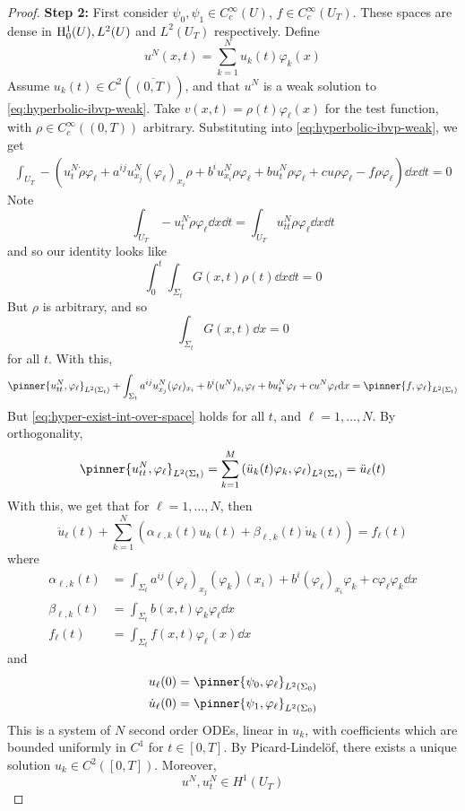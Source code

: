 \documentclass{article}
\begin{document}
\begin{proof}
    \textbf{Step 2:} First consider \(\psi_0, \psi_1 \in C_c^\infty(U)\), \(f \in C_c^\infty(U_T)\). These spaces are dense in \(\mathrm{H}^1_0(U), L^2(U)\) and \(L^2(U_T)\) respectively. Define
    \[u^N(x, t) = \sum_{k=1}^N u_k(t)\varphi_k(x)\]
    Assume \(u_k(t) \in C^2(\overline{(0, T)})\), and that \(u^N\) is a weak solution to \cref{eq:hyperbolic-ibvp-weak}. Take \(v(x, t) = \rho(t)\varphi_\ell(x)\) for the test function, with \(\rho \in C_c^\infty((0, T))\) arbitrary. Substituting into \cref{eq:hyperbolic-ibvp-weak}, we get
    \begin{align*}
        \int_{U_T}-(u^N_t \dot\rho \varphi_\ell + a^{ij}u^N_{x_j}(\varphi_\ell)_{x_i}\rho + b^i u^N_{x_i}\rho \varphi_\ell + b u^N_t \rho\varphi_\ell + cu\rho\varphi_\ell - f\rho\varphi_\ell)\dd x \dd t = 0
    \end{align*}
    Note
    \[\int_{U_T} -u^N_t \dot\rho \varphi_\ell \dd x \dd t = \int_{U_T}u^N_{tt}\rho\varphi_\ell \dd x\dd t\]
    and so our identity looks like
    \[\int_0^t\int_{\Sigma_t}G(x, t)\rho(t)\dd x \dd t = 0\]
    But \(\rho\) is arbitrary, and so
    \[\int_{\Sigma_t}G(x, t) \dd x = 0\]
    for all \(t\). With this,
    \begin{equation}
        \label{eq:hyper-exist-int-over-space}
        \pinner{u^N_{tt}, \varphi_\ell}_{L^2(\Sigma_t)} + \int_{\Sigma_t}a^{ij}u^N_{x_j}(\varphi_\ell)_{x_i} + b^i(u^N)_{x_i} \varphi_\ell + bu^N_t \varphi_\ell + cu^N\varphi_\ell \dd x = \pinner{f, \varphi_\ell}_{L^2(\Sigma_t)}
    \end{equation}
    But \cref{eq:hyper-exist-int-over-space} holds for all \(t\), and \(\ell = 1, \dots, N\). By orthogonality,
    \[\pinner{u^N_{tt}, \varphi_\ell}_{L^2(\Sigma_t)} = \sum_{k=1}^M\left(\ddot u_k(t)\varphi_k, \varphi_\ell\right)_{L^2(\Sigma_t)} = \ddot u_\ell(t)\]
    With this, we get that for \(\ell = 1, \dots, N\), then
    \[\ddot u_\ell(t) + \sum_{k=1}^N (\alpha_{\ell, k}(t)u_k(t) + \beta_{\ell, k}(t)\dot u_k(t)) = f_\ell(t)\]
    where
    \begin{align*}
        \alpha_{\ell, k}(t) &= \int_{\Sigma_t}a^{ij}(\varphi_\ell)_{x_j}(\varphi_k)(x_i) + b^i(\varphi_\ell)_{x_i}\varphi_k + c\varphi_\ell\varphi_k \dd x \\
        \beta_{\ell, k}(t) &= \int_{\Sigma_t}b(x, t)\varphi_k\varphi_\ell \dd x \\
        f_\ell(t) &= \int_{\Sigma_t}f(x, t)\varphi_\ell(x) \dd x
    \end{align*}
    and
    \begin{align*}
        u_\ell(0) &= \pinner{\psi_0, \varphi_\ell}_{L^2(\Sigma_0)} \\
        \dot u_\ell(0) &= \pinner{\psi_1, \varphi_\ell}_{L^2(\Sigma_0)} \\
    \end{align*}
    This is a system of \(N\) second order ODEs, linear in \(u_k\), with coefficients which are bounded uniformly in \(C^1\) for \(t \in [0, T]\). By Picard-Lindel\"of, there exists a unique solution \(u_k \in C^2([0, T])\). Moreover,
    \[u^N, u^N_t \in H^1(U_T)\]


\end{proof}
\end{document}

